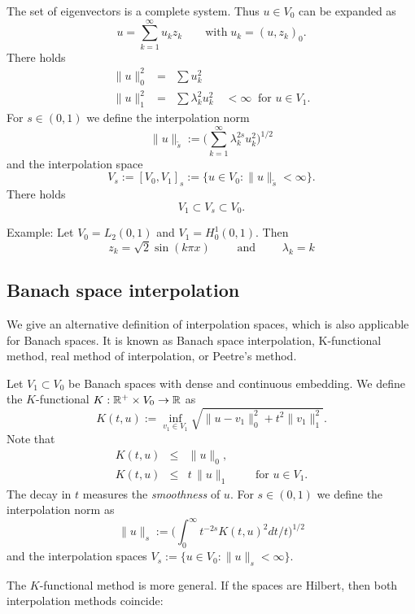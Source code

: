 The set of eigenvectors is a complete system. Thus $u \in V_0$ can be 
expanded as
$$
u = \sum_{k=1}^\infty u_k z_k \qquad \text{with} \; u_k = (u, z_k)_0.
$$
There holds
\begin{eqnarray*}
\| u \|_0^2 & = & \sum u_k^2 \\
\| u \|_1^2 & = & \sum \lambda_k^2 u_k^2  \quad < \infty \; \; \text{for } u \in V_1.
\end{eqnarray*}
For $s \in (0,1)$ we define the interpolation norm
\begin{equation}
\| u \|_{\tilde s} := \Big( \sum_{k=1}^\infty \lambda_k^{2s} u_k^2 \Big)^{1/2}
\end{equation}
and the interpolation space
$$
V_s := [V_0,V_1]_s := \{ u \in V_0 : \| u \|_{\tilde s} < \infty \}.
$$
There holds
$$
V_1 \subset V_s \subset V_0.
$$

{Example:} Let $V_0 = L_2(0,1)$ and $V_1 = H_0^1(0,1)$. Then
$$
z_k = \sqrt{2}\sin (k\pi x) \qquad \text{ and } \qquad \lambda_k = k
$$

\subsection{Banach space interpolation}
We give an alternative definition of interpolation spaces, which is also applicable for Banach spaces. It is known as Banach space interpolation, K-functional method, real method of interpolation, or Peetre's method. 

Let $V_1 \subset V_0$ be Banach spaces with dense and continuous embedding. We 
define the $K$-functional $K : {\mathbb R}^+ \times V_0 \rightarrow {\mathbb R}$ as
$$
K(t,u) := \inf_{v_1 \in V_1}  \sqrt{ \| u - v_1 \|_0^2 + t^2 \| v_1 \|_1^2}.
$$
Note that
\begin{eqnarray*} 
K(t,u) & \leq & \| u \|_0, \\
K(t,u) & \leq & t \, \| u \|_1 \qquad \text{ for } u \in V_1.
\end{eqnarray*}
The decay in $t$ measures the {\it smoothness} of $u$. For $s \in (0,1)$ we define
the interpolation norm as
\begin{equation}
\| u \|_s := \Big(  \int_0^\infty t^{-2s} K(t,u)^2 dt/t \Big)^{1/2}
\end{equation}
and the interpolation spaces $V_s := \{ u \in V_0 : \| u \|_s < \infty \}$.


The $K$-functional method is more general. If the spaces are Hilbert, then both
interpolation methods coincide:

